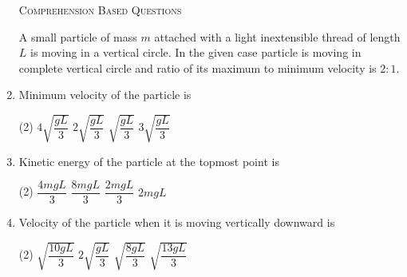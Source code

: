 \documentclass{article}
\renewcommand{\ans}{\quad}
\begin{document}
\begin{enumerate}
    
    \begin{center}
        \textsc{Comprehension Based Questions}
    \end{center}
    A small particle of mass $m$ attached with a light inextensible thread of length $L$ is moving in a vertical circle. In the given case particle is moving in complete vertical circle and ratio of its maximum to minimum velocity is $2 : 1$.
    \begin{center}
    \end{center}
    \item Minimum velocity of the particle is
    \begin{tasks}(2)
        \task $4\sqrt{\dfrac{gL}{3}}$
        \task $2\sqrt{\dfrac{gL}{3}}$\ans
        \task $\sqrt{\dfrac{gL}{3}}$
        \task $3\sqrt{\dfrac{gL}{3}}$
    \end{tasks}

    \item Kinetic energy of the particle at the topmost point is
    \begin{tasks}(2)
        \task $\dfrac{4mgL}{3}$
        \task $\dfrac{8mgL}{3}$\ans
        \task $\dfrac{2mgL}{3}$
        \task $2mgL$
    \end{tasks}

    \item Velocity of the particle when it is moving vertically downward is
    \begin{tasks}(2)
        \task $\sqrt{\dfrac{10gL}{3}}$\ans
        \task $2\sqrt{\dfrac{gL}{3}}$
        \task $\sqrt{\dfrac{8gL}{3}}$
        \task $\sqrt{\dfrac{13gL}{3}}$
    \end{tasks}
    \pagebreak


\end{enumerate}
\end{document}
